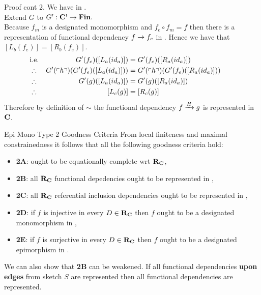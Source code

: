 \begin{frame}{Proof cont 2.}
We have   in \catcp.\\
\medskip
Extend $G$ to $G':\catcp \morph \Fin.$ \\
Because $f_m$ is a designated monomorphism and $f_e \circ f_m = f$ then
there is a representation of functional dependency $f \morph f_e$ in \catc.
Hence  we have that $[L_b(f_e)]= [R_b(f_e)]$.
\medskip
\begin{align*}
&\mbox{i.e.}& G'(f_e)([L_a(id_a)])              &= G'(f_e)([R_a(id_a)])       \\
&\therefore & G'(\qq{h}) (G'(f_e)([L_a(id_a)])) &= G'(\qq{h}) (G'(f_e)([R_a(id_a)])) \\
&\therefore & G'(g)([L_a(id_a)])              &= G'(g)([R_a(id_a)]) & &    \\
&\therefore & [L_c(g)] &= [R_c(g)] 
\end{align*}
Therefore by definition of $\sim$ the functional dependency
$\fundep{H}{f}{g}$ is represented in $\catc$.
\end{frame}

\begin{frame}{Epi Mono Type 2 Goodness Criteria}
From local finiteness and maximal constrainedness it follows that all the following goodness criteria hold: 
\begin{itemize}
\item \textbf{2A}:  \catcw ought to be equationally complete wrt $\reqtc$,         
\item \textbf{2B}:  all $\reqtc$ functional depedencies ought to be represented in \catc,
\item \textbf{2C}:  all $\reqtc$ referential inclusion dependencies ought to be represented in \catc, 
\pause \item \textbf{2D}:  if $f$ is injective in every $D \in \reqtc$ then $f$ ought to be a designated monomorphism in \catc,
\pause \item \textbf{2E}:  if $f$ is surjective in every $D \in \reqtc$ then $f$ ought to be a designated epimorphism in \catc.
\end{itemize}
We can also show that \textbf{2B} can be weakened. If all functional dependencies \textbf{upon edges} from sketch $S$ are represented then 
all functional dependencies are represented. 
\end{frame}

